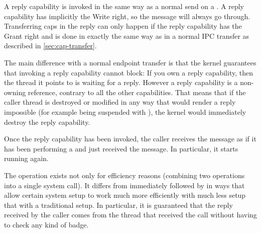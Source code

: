 A reply capability is invoked in the same way as a normal send on a
. A reply capability has implicitly the Write right, so the
message will always go through. Transferring caps in the reply can only happen
if the reply capability has the Grant right and is done in exactly the same way
as in a normal IPC transfer as described in \autoref{sec:cap-transfer}.

The main difference with a normal endpoint transfer is that the kernel guarantees
that invoking a reply capability cannot block: If you own a reply capability,
then the thread it points to is waiting for a reply. However a reply capability
is a non-owning reference, contrary to all the other capabilities. That means that
if the caller thread is destroyed or modified in any way that would render
a reply impossible (for example being suspended with
), the kernel would immediately destroy
the reply capability.

Once the reply capability has been invoked, the caller receives the message as if
it has been performing a  and just received the
message. In particular, it starts running again.

The  operation exists not only for
efficiency reasons (combining two operations into a single system
call). It differs from
 immediately followed by
 in ways that allow certain system setup to work
much more efficiently with much less setup that with a traditional setup.
In particular, it is guaranteed that the reply received by the caller comes from
the thread that received the call without having to check any kind of badge.
